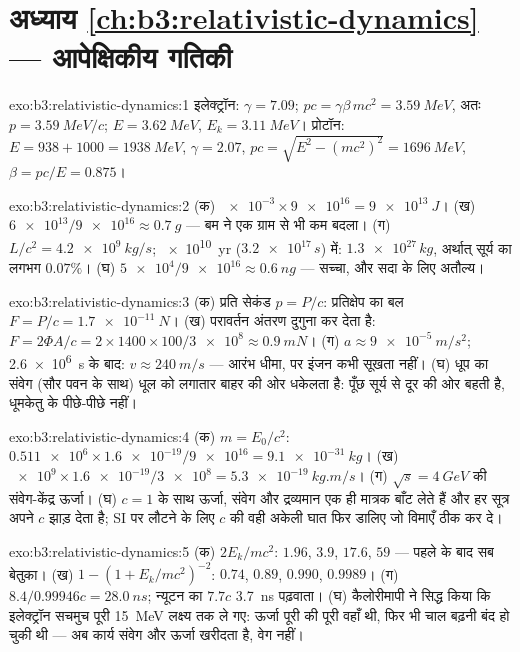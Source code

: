 \section*{अध्याय \ref{ch:b3:relativistic-dynamics} --- आपेक्षिकीय गतिकी}

\begin{solution}{exo:b3:relativistic-dynamics:1}
इलेक्ट्रॉन: $\gamma = 7.09$; $pc = \gamma\beta\,mc^2 = \qty{3.59}{MeV}$,
अतः $p = \qty{3.59}{MeV}/c$; $E = \qty{3.62}{MeV}$, $E_k =
\qty{3.11}{MeV}$। प्रोटॉन: $E = 938 + 1000 = \qty{1938}{MeV}$, $\gamma
= 2.07$, $pc = \sqrt{E^2 - (mc^2)^2} = \qty{1696}{MeV}$, $\beta =
pc/E = 0.875$।
\end{solution}

\begin{solution}{exo:b3:relativistic-dynamics:2}
(क) $\num{e-3} \times \num{9e16} = \qty{9e13}{J}$। (ख) $\num{6e13}/
\num{9e16} \approx \qty{0.7}{g}$ --- बम ने एक ग्राम से भी कम
बदला। (ग) $L/c^2 = \qty{4.2e9}{kg/s}$; \qty{e10}{yr}
($\num{3.2e17}{}\,\unit{s}$) में: $\num{1.3e27}{}\,\unit{kg}$, अर्थात्
सूर्य का लगभग $0.07\%$। (घ) $\num{5e4}/\num{9e16} \approx
\qty{0.6}{ng}$ --- सच्चा, और सदा के लिए अतौल्य।
\end{solution}

\begin{solution}{exo:b3:relativistic-dynamics:3}
(क) प्रति सेकंड $p = P/c$: प्रतिक्षेप का बल $F = P/c = \qty{1.7e-11}{N}$।
(ख) परावर्तन अंतरण दुगुना कर देता है: $F = 2\Phi A/c =
2 \times 1400 \times 100/\num{3e8} \approx \qty{0.9}{mN}$। (ग) $a
\approx \qty{9e-5}{m/s^2}$; \qty{2.6e6}{s} के बाद: $v \approx
\qty{240}{m/s}$ --- आरंभ धीमा, पर इंजन कभी सूखता नहीं। (घ)
धूप का संवेग (सौर पवन के साथ) धूल को लगातार बाहर की ओर धकेलता है:
पूँछ सूर्य से दूर की ओर बहती है, धूमकेतु के पीछे-पीछे नहीं।
\end{solution}

\begin{solution}{exo:b3:relativistic-dynamics:4}
(क) $m = E_0/c^2$: $\num{0.511e6} \times \num{1.6e-19}/\num{9e16} =
\qty{9.1e-31}{kg}$। (ख) $\num{e9} \times \num{1.6e-19}/\num{3e8} =
\qty{5.3e-19}{kg.m/s}$। (ग) $\sqrt s = \qty{4}{GeV}$ की
संवेग-केंद्र ऊर्जा। (घ) $c = 1$ के साथ ऊर्जा, संवेग और
द्रव्यमान एक ही मात्रक बाँट लेते हैं और हर सूत्र अपने $c$ झाड़ देता है;
SI पर लौटने के लिए $c$ की वही अकेली घात फिर डालिए जो विमाएँ ठीक कर दे।
\end{solution}

\begin{solution}{exo:b3:relativistic-dynamics:5}
(क) $2E_k/mc^2$: $1.96$, $3.9$, $17.6$, $59$ --- पहले के बाद सब
बेतुका। (ख) $1 - (1 + E_k/mc^2)^{-2}$: $0.74$, $0.89$, $0.990$,
$0.9989$। (ग) $8.4/0.99946c = \qty{28.0}{ns}$; न्यूटन का $7.7c$
\qty{3.7}{ns} पढ़वाता। (घ) कैलोरीमापी ने सिद्ध किया कि इलेक्ट्रॉन
सचमुच पूरी \qty{15}{MeV} लक्ष्य तक ले गए: ऊर्जा
पूरी की पूरी वहाँ थी, फिर भी चाल बढ़नी बंद हो चुकी थी --- अब कार्य
संवेग और ऊर्जा खरीदता है, वेग नहीं।
\end{solution}

